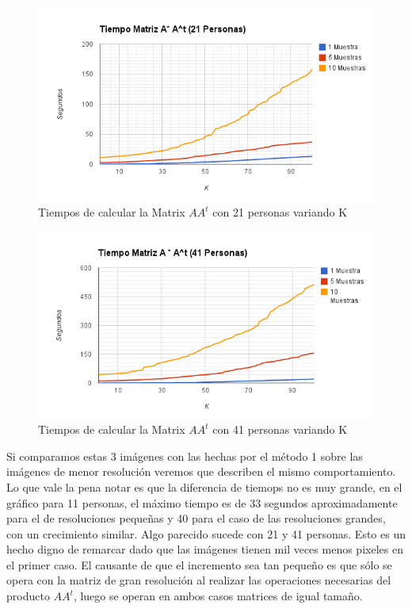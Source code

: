 \begin{figure}[H] \includegraphics[width=1\textwidth]{img/imagef2.png} \caption{Tiempos de calcular
    la Matrix $AA^t$ con 21 personas variando K} \end{figure}

\begin{figure}[H] \includegraphics[width=1\textwidth]{img/imagef3.png} \caption{Tiempos de calcular
    la Matrix $AA^t$ con 41 personas variando K} \end{figure}

Si comparamos estas 3 imágenes con las hechas por el método 1 sobre las imágenes de menor resolución
veremos que describen el mismo comportamiento. Lo que vale
la pena notar es que la diferencia de tiemops no es muy grande, en el gráfico para 11 personas, el
máximo tiempo es de 33 segundos aproximadamente para el de resoluciones pequeñas y 40 para el caso
de las resoluciones grandes, con un crecimiento similar. Algo parecido sucede con 21 y 41 personas.
Esto es un hecho digno de remarcar dado que las imágenes tienen mil veces menos pixeles en el primer
caso. El causante de que el incremento sea tan peque\~no es que s\'olo se opera con la matriz de gran resoluci\'on al realizar las operaciones necesarias del producto $AA^t$, luego se operan en ambos casos matrices de igual tama\~no.

